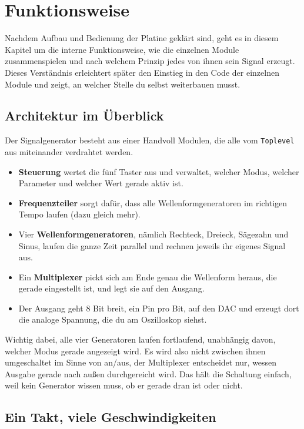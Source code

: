 \chapter{Funktionsweise}
\label{ch:funktionsweise}

Nachdem Aufbau und Bedienung der Platine geklärt sind, geht es in diesem Kapitel um die interne Funktionsweise, wie die einzelnen Module zusammenspielen und nach welchem Prinzip jedes von ihnen sein Signal erzeugt. Dieses Verständnis erleichtert später den Einstieg in den Code der einzelnen Module und zeigt, an welcher Stelle du selbst weiterbauen musst.

\section{Architektur im Überblick}

Der Signalgenerator besteht aus einer Handvoll Modulen, die alle vom \texttt{Toplevel} aus miteinander verdrahtet werden.

\begin{itemize}
    \item \textbf{Steuerung} wertet die fünf Taster aus und verwaltet, welcher Modus, welcher Parameter und welcher Wert gerade aktiv ist.
    \item \textbf{Frequenzteiler} sorgt dafür, dass alle Wellenformgeneratoren im richtigen Tempo laufen (dazu gleich mehr).
    \item Vier \textbf{Wellenformgeneratoren}, nämlich Rechteck, Dreieck, Sägezahn und Sinus, laufen die ganze Zeit parallel und rechnen jeweils ihr eigenes Signal aus.
    \item Ein \textbf{Multiplexer} pickt sich am Ende genau die Wellenform heraus, die gerade eingestellt ist, und legt sie auf den Ausgang.
    \item Der Ausgang geht 8 Bit breit, ein Pin pro Bit, auf den DAC und erzeugt dort die analoge Spannung, die du am Oszilloskop siehst.
\end{itemize}

Wichtig dabei, alle vier Generatoren laufen fortlaufend, unabhängig davon, welcher Modus gerade angezeigt wird. Es wird also nicht zwischen ihnen \glqq umgeschaltet\grqq{} im Sinne von an/aus, der Multiplexer entscheidet nur, wessen Ausgabe gerade nach außen durchgereicht wird. Das hält die Schaltung einfach, weil kein Generator wissen muss, ob er gerade \glqq dran\grqq{} ist oder nicht.

\section{Ein Takt, viele Geschwindigkeiten}


